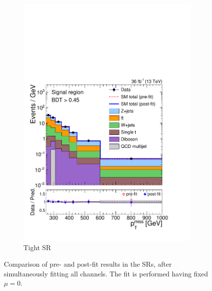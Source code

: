 \begin{figure}[]
\begin{center}
\begin{subfigure}[t]{0.49\textwidth}
            \includegraphics[width=\textwidth]{figures/monotop/postfit/stackedPostfit_signal_monotop.pdf}
            \caption{Tight SR}
        \end{subfigure}
        \caption{Comparison of pre- and post-fit results in the SRs, after simultaneously fitting all channels.
        The fit is performed having fixed $\mu=0$.}
        \label{fig:mt:postfit_sig}
    \end{center}
\end{figure}

